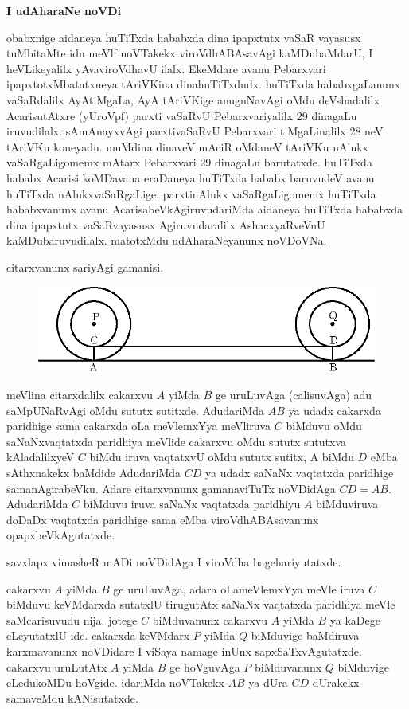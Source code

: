 {\bf I udAharaNe noVDi}

obabxnige aidaneya huTiTxda hababxda dina ipapxtutx vaSaR vayasusx tuMbitaMte idu meVlf noVTakekx viroVdhABAsavAgi kaMDubaMdarU, I heVLikeyalilx yAva\break viroVdhavU ilalx. EkeMdare avanu Pebarxvari ipapxtotxMbatatxneya tAriVKina dina\break huTiTxdudx. huTiTxda hababxgaLanunx vaSaRdalilx AyAtiMgaLa, AyA tAriVKige anuguNa\-vAgi oMdu deVshadalilx AcarisutAtxre (yUroVpf) parxti vaSaRvU Pebarxvariyalilx {\rm 29} dinagaLu iruvudilalx. sAmAnayxvAgi parxtivaSaRvU Pebarxvari tiMgaLinalilx {\rm 28} neV tAriVKu koneyadu. muMdina dinaveV mAciR oMdaneV tAriVKu nAlukx vaSaRgaLigomemx mAtarx Pebarxvari {\rm 29} dinagaLu barutatxde. huTiTxda hababx Acarisi koMDavana eraDaneya huTiTxda hababx baruvudeV avanu huTiTxda nAlukxvaSaRgaLige. parxtinAlukx vaSaRgaLigomemx huTiTxda hababxvanunx avanu AcarisabeVkAgiruvudariMda aidaneya huTiTxda hababxda dina ipapxtutx vaSaRvayasusx Agiruvudaralilx AshacxyaRveVnU kaMDubaruvudilalx. matotxMdu udAharaNeyanunx noVDoVNa.

citarxvanunx sariyAgi gamanisi.
\begin{figure}[H]
\centering
\includegraphics{src/figures/083.eps}
\end{figure}

meVlina citarxdalilx cakarxvu $A$ yiMda $B$ ge uruLuvAga (calisuvAga) adu saMpUNaRvAgi oMdu sututx sutitxde. AdudariMda $AB$ ya udadx cakarxda paridhige sama cakarxda oLa meVlemxYya meVliruva $C$ biMduvu oMdu saNaNxvaqtatxda paridhiya meVlide cakarxvu oMdu sututx sututxva kAladalilxyeV $C$ biMdu iruva vaqtatxvU oMdu sututx sutitx, A biMdu $D$ eMba sAthxnakekx baMdide AdudariMda $CD$ ya udadx saNaNx vaqtatxda paridhige samanAgirabeVku. Adare citarxvanunx gamanaviTuTx noVDidAga $CD=AB$. AdudariMda $C$ biMduvu iruva saNaNx vaqtatxda paridhiyu $A$ biMduviruva doDaDx vaqtatxda paridhige sama eMba viroVdhABAsavanunx opapxbeVkAgutatxde.

savxlapx vimasheR mADi noVDidAga I viroVdha bagehariyutatxde.

cakarxvu $A$ yiMda $B$ ge uruLuvAga, adara oLameVlemxYya meVle iruva $C$ biMduvu keVMdarxda sutatxlU tirugutAtx saNaNx vaqtatxda paridhiya meVle saMcarisuvudu nija. jotege $C$ biMduvanunx cakarxvu $A$ yiMda $B$ ya kaDege eLeyutatxlU ide. cakarxda keVMdarx $P$ yiMda $Q$ biMduvige baMdiruva karxmavanunx noVDidare I viSaya namage inUnx sapxSaTxvAgutatxde. cakarxvu uruLutAtx $A$ yiMda $B$ ge hoVguvAga $P$ biMduvanunx $Q$ biMduvige eLedukoMDu hoVgide. idariMda noVTakekx $AB$ ya dUra $CD$ dUrakekx samaveMdu kANisutatxde. 

